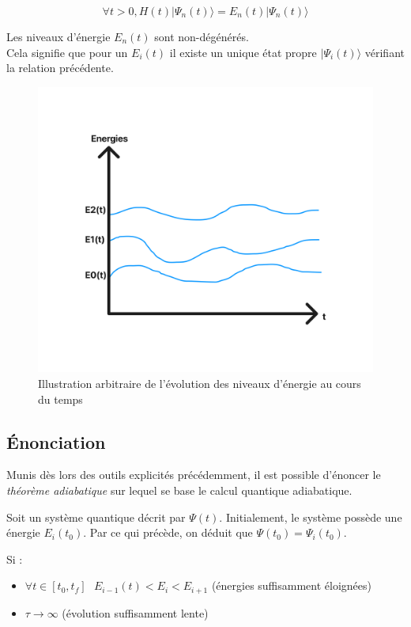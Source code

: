 \documentclass{article}
\begin{document}
$$\forall t>0, H(t)|\Psi_n(t)\rangle=E_n(t)|\Psi_n(t)\rangle$$

\noindent Les niveaux d'énergie $E_n(t)$ sont non-dégénérés. \\ Cela signifie que pour un $E_i(t)$ il existe un unique état propre $|\Psi_i(t)\rangle$ vérifiant la relation précédente.

\begin{figure}[h]
    \centering
    \includegraphics[scale=0.25]{rsc/energies.png}
    \caption{Illustration arbitraire de l'évolution des niveaux d'énergie au cours du temps}
    \label{fig:enter-label}
\end{figure}

\newpage
\subsection{Énonciation}

Munis dès lors des outils explicités précédemment, il est possible d'énoncer le \emph{théorème adiabatique} sur lequel se base le calcul quantique adiabatique.

\medskip

Soit un système quantique décrit par $\Psi(t)$. Initialement, le système possède une énergie $E_i(t_0)$. Par ce qui précède, on déduit que $\Psi(t_0)=\Psi_i(t_0)$. 

\bigskip

Si : 

\begin{itemize}
    \item $\forall t\in [t_0,t_f] \text{  } E_{i-1}(t)<E_i<E_{i+1}$ (énergies suffisamment éloignées)
    \item $\tau \xrightarrow{} \infty$ (évolution suffisamment lente)
\end{itemize}
\end{document}
